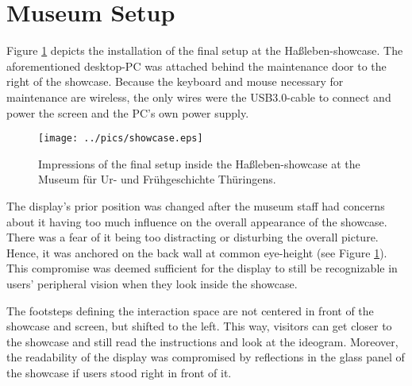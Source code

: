 
\section{Museum Setup}
\label{setup_museum}

Figure \ref{fig:museum_setup} depicts the installation of the final setup at the Haßleben-showcase. The aforementioned desktop-PC was attached behind the maintenance door to the right of the showcase. Because the keyboard and mouse necessary for maintenance are wireless, the only wires were the USB3.0-cable to connect and power the screen and the PC's own power supply. 
\begin{figure}[H]%
\texttt{[image: ../pics/showcase.eps]}%
\caption{Impressions of the final setup inside the Haßleben-showcase at the Museum für Ur- und Frühgeschichte Thüringens.}%
\label{fig:museum_setup} %
\end{figure}

The display's prior position was changed after the museum staff had concerns about it having too much influence on the overall appearance of the showcase. There was a fear of it being too distracting or disturbing the overall picture. Hence, it was anchored on the back wall at common eye-height (see Figure \ref{fig:museum_setup}). This compromise was deemed sufficient for the display to still be recognizable in users' peripheral vision when they look inside the showcase.

The footsteps defining the interaction space are not centered in front of the showcase and screen, but shifted to the left. This way, visitors can get closer to the showcase and still read the instructions and look at the ideogram. Moreover, the readability of the display was compromised by reflections in the glass panel of the showcase if users stood right in front of it.

